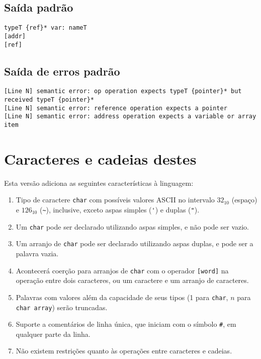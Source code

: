 \documentclass{sftex/sftex}
\newenvironment{smallenum}{
    \vspace{-1mm}
    \begin{enumerate}[label=\roman*.]
    \setlength{\parskip}{0pt}
    \setlength{\itemsep}{2pt}
}{
    \vspace{-2mm}
    \end{enumerate}
}
\begin{document}
\subsection{Saída padrão}

\begin{verbatim}
typeT {ref}* var: nameT
[addr]
[ref]
\end{verbatim}

\subsection{Saída de erros padrão}

\begin{verbatim}
[Line N] semantic error: op operation expects typeT {pointer}* but received typeT {pointer}*
[Line N] semantic error: reference operation expects a pointer
[Line N] semantic error: address operation expects a variable or array item
\end{verbatim}

\section{Caracteres e cadeias destes}

Esta versão adiciona as seguintes características à linguagem:

\begin{smallenum}

\item Tipo de caractere \verb!char! com possíveis valores ASCII no intervalo
    $32_{10}$ (espaço) e $126_{10}$ (\verb!~!), inclusive, exceto aspas
    simples (\verb!'!) e duplas (\verb!"!).

\item Um \verb!char! pode ser declarado utilizando aspas simples, e não
    pode ser vazio.

\item Um arranjo de \verb!char! pode ser declarado utilizando aspas duplas,
    e pode ser a palavra vazia.

\item Acontecerá coerção para arranjos de \verb!char! com o operador
    \verb![word]! na operação entre dois caracteres, ou um caractere e um
    arranjo de caracteres.

\item Palavras com valores além da capacidade de seus tipos (1 para
    \verb!char!, $n$ para \verb!char array!) serão truncadas.

\item Suporte a comentários de linha única, que iniciam com o símbolo
    \verb!#!, em qualquer parte da linha.

\item Não existem restrições quanto às operações entre caracteres e cadeias.

\end{smallenum}
\end{document}
